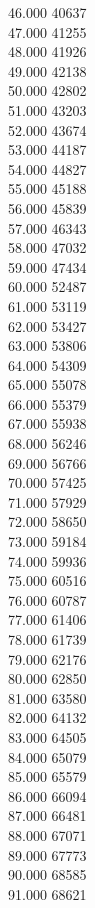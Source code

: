 { 46.000	40637 \\
 47.000	41255 \\
 48.000	41926 \\
 49.000	42138 \\
 50.000	42802 \\
 51.000	43203 \\
 52.000	43674 \\
 53.000	44187 \\
 54.000	44827 \\
 55.000	45188 \\
 56.000	45839 \\
 57.000	46343 \\
 58.000	47032 \\
 59.000	47434 \\
 60.000	52487 \\
 61.000	53119 \\
 62.000	53427 \\
 63.000	53806 \\
 64.000	54309 \\
 65.000	55078 \\
 66.000	55379 \\
 67.000	55938 \\
 68.000	56246 \\
 69.000	56766 \\
 70.000	57425 \\
 71.000	57929 \\
 72.000	58650 \\
 73.000	59184 \\
 74.000	59936 \\
 75.000	60516 \\
 76.000	60787 \\
 77.000	61406 \\
 78.000	61739 \\
 79.000	62176 \\
 80.000	62850 \\
 81.000	63580 \\
 82.000	64132 \\
 83.000	64505 \\
 84.000	65079 \\
 85.000	65579 \\
 86.000	66094 \\
 87.000	66481 \\
 88.000	67071 \\
 89.000	67773 \\
 90.000	68585 \\
 91.000	68621 \\
}
